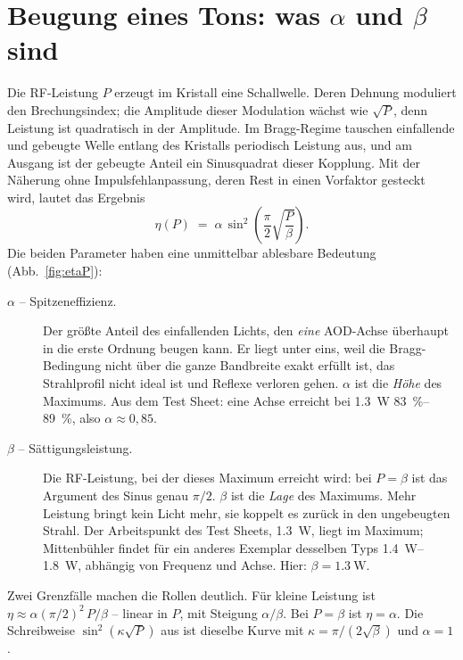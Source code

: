 \documentclass[11pt,a4paper]{article}
\begin{document}
\section{Beugung eines Tons: was $\alpha$ und $\beta$ sind}

Die RF-Leistung $P$ erzeugt im Kristall eine Schallwelle. Deren Dehnung
moduliert den Brechungsindex; die Amplitude dieser Modulation wächst wie
$\sqrt{P}$, denn Leistung ist quadratisch in der Amplitude. Im Bragg-Regime
tauschen einfallende und gebeugte Welle entlang des Kristalls periodisch
Leistung aus, und am Ausgang ist der gebeugte Anteil ein Sinusquadrat dieser
Kopplung. Mit der Näherung ohne Impulsfehlanpassung, deren Rest in einen
Vorfaktor gesteckt wird, lautet das Ergebnis
\cite[Gl.~3.12]{mittenbuehler}
\begin{equation}
  \eta(P) \;=\; \alpha\,\sin^2\!\left(\frac{\pi}{2}\sqrt{\frac{P}{\beta}}\right).
  \label{eq:eta1}
\end{equation}
Die beiden Parameter haben eine unmittelbar ablesbare Bedeutung
(Abb.~\ref{fig:etaP}):

\begin{description}
\item[$\alpha$ -- Spitzeneffizienz.] Der größte Anteil des einfallenden Lichts,
  den \emph{eine} AOD-Achse überhaupt in die erste Ordnung beugen kann. Er
  liegt unter eins, weil die Bragg-Bedingung nicht über die ganze Bandbreite
  exakt erfüllt ist, das Strahlprofil nicht ideal ist und Reflexe verloren
  gehen. $\alpha$ ist die \emph{Höhe} des Maximums. Aus dem Test Sheet: eine
  Achse erreicht bei \SI{1,3}{\watt} \SIrange{83}{89}{\percent}, also
  $\alpha\approx0{,}85$.
\item[$\beta$ -- Sättigungsleistung.] Die RF-Leistung, bei der dieses Maximum
  erreicht wird: bei $P=\beta$ ist das Argument des Sinus genau $\pi/2$. $\beta$
  ist die \emph{Lage} des Maximums. Mehr Leistung bringt kein Licht mehr, sie
  koppelt es zurück in den ungebeugten Strahl. Der Arbeitspunkt des Test
  Sheets, \SI{1,3}{\watt}, liegt im Maximum; Mittenbühler findet für ein
  anderes Exemplar desselben Typs \SIrange{1,4}{1,8}{\watt}, abhängig von
  Frequenz und Achse. Hier: $\beta=\SI{1,3}{\watt}$.
\end{description}

Zwei Grenzfälle machen die Rollen deutlich. Für kleine Leistung ist
$\eta\approx\alpha(\pi/2)^2\,P/\beta$ -- linear in $P$, mit Steigung
$\alpha/\beta$. Bei $P=\beta$ ist $\eta=\alpha$. Die Schreibweise
$\sin^2(\kappa\sqrt{P})$ aus \cite[Gl.~181]{crest} ist dieselbe Kurve mit
$\kappa=\pi/(2\sqrt{\beta})$ und $\alpha=1$.
\end{document}
